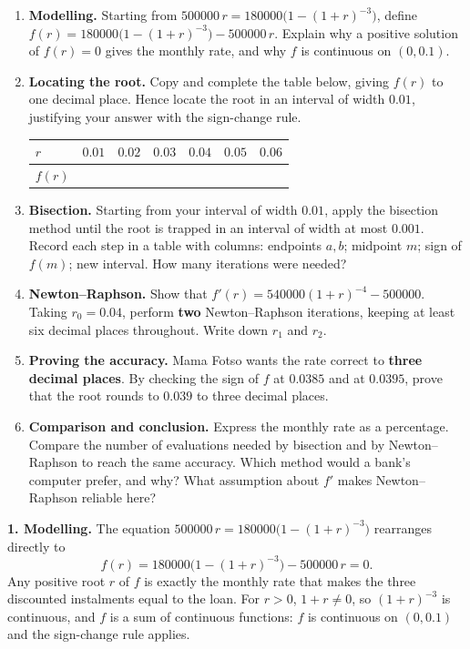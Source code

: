\documentclass[11pt]{article}
\newcounter{popsec}
\newcounter{popsub}
\newcommand{\courssub}[1]{%
  \stepcounter{popsub}%
  \par\vspace{9pt}\noindent{\popxbold\fontsize{11.5}{13}\selectfont\color{popink}{\color{poporange}\thepopsec.\thepopsub}\hspace{6pt}#1}\par\nopagebreak\vspace{4pt}
}
\begin{document}
\begin{enumerate}
\item \textbf{Modelling.} Starting from $500000\,r=180000\bigl(1-(1+r)^{-3}\bigr)$, define $f(r)=180000\bigl(1-(1+r)^{-3}\bigr)-500000\,r$. Explain why a positive solution of $f(r)=0$ gives the monthly rate, and why $f$ is continuous on $(0,0.1)$.
\item \textbf{Locating the root.} Copy and complete the table below, giving $f(r)$ to one decimal place. Hence locate the root in an interval of width $0.01$, justifying your answer with the sign-change rule.
\begin{center}
\begin{tabular}{|l|*{6}{c|}}
\hline
\rowcolor{popblueL} $r$ & $0.01$ & $0.02$ & $0.03$ & $0.04$ & $0.05$ & $0.06$ \\
\hline $f(r)$ & & & & & & \\
\hline
\end{tabular}
\end{center}
\item \textbf{Bisection.} Starting from your interval of width $0.01$, apply the bisection method until the root is trapped in an interval of width at most $0.001$. Record each step in a table with columns: endpoints $a,b$; midpoint $m$; sign of $f(m)$; new interval. How many iterations were needed?
\item \textbf{Newton--Raphson.} Show that $f'(r)=540000(1+r)^{-4}-500000$. Taking $r_0=0.04$, perform \textbf{two} Newton--Raphson iterations, keeping at least six decimal places throughout. Write down $r_1$ and $r_2$.
\item \textbf{Proving the accuracy.} Mama Fotso wants the rate correct to \textbf{three decimal places}. By checking the sign of $f$ at $0.0385$ and at $0.0395$, prove that the root rounds to $0.039$ to three decimal places.
\item \textbf{Comparison and conclusion.} Express the monthly rate as a percentage. Compare the number of evaluations needed by bisection and by Newton--Raphson to reach the same accuracy. Which method would a bank's computer prefer, and why? What assumption about $f'$ makes Newton--Raphson reliable here?
\end{enumerate}

\courssub{Model answer}

\textbf{1. Modelling.} The equation $500000\,r=180000\bigl(1-(1+r)^{-3}\bigr)$ rearranges directly to
\[
f(r)=180000\bigl(1-(1+r)^{-3}\bigr)-500000\,r=0.
\]
Any positive root $r$ of $f$ is exactly the monthly rate that makes the three discounted instalments equal to the loan. For $r>0$, $1+r\neq0$, so $(1+r)^{-3}$ is continuous, and $f$ is a sum of continuous functions: $f$ is continuous on $(0,0.1)$ and the sign-change rule applies.
\end{document}
